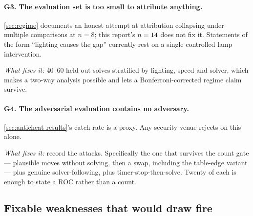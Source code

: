 \paragraph{G3. The evaluation set is too small to attribute anything.}
\cref{sec:regime} documents an honest attempt at attribution collapsing
under multiple comparisons at $n=8$; this report's $n=14$ does
not fix it. Statements of the form ``lighting causes the gap'' currently
rest on a single controlled lamp intervention.

\emph{What fixes it:} 40--60 held-out solves stratified by lighting, speed
and solver, which makes a two-way analysis possible and lets a
Bonferroni-corrected regime claim survive.

\paragraph{G4. The adversarial evaluation contains no adversary.}
\cref{sec:anticheat-results}'s catch rate is a proxy. Any security venue
rejects on this alone.

\emph{What fixes it:} record the attacks. Specifically the one that survives
the count gate --- plausible moves without solving, then a swap, including
the table-edge variant --- plus genuine solver-following, plus
timer-stop-then-solve. Twenty of each is enough to state a ROC rather than a
count.

\subsection{Fixable weaknesses that would draw fire}

